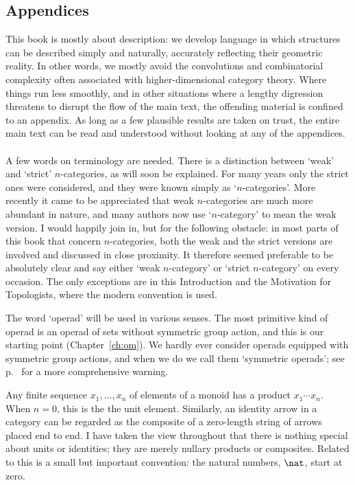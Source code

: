 \subsection*{Appendices}

This book is mostly about description: we develop language in which
structures can be described simply and naturally, accurately reflecting
their geometric reality.  In other words, we mostly avoid the convolutions
and combinatorial complexity often associated with higher-dimensional
category theory.  Where things run less smoothly, and in other situations
where a lengthy digression threatens to disrupt the flow of the main text,
the offending material is confined to an appendix.  As long as a few
plausible results are taken on trust, the entire main text can be read and
understood without looking at any of the appendices.




\paragraph*{}

A few words on terminology are needed.  There is a distinction between
`weak' and `strict' $n$-categories,%
%
%
as will soon be explained.  For many
years only the strict ones were considered, and they were known simply as
`$n$-categories'.  More recently it came to be appreciated that weak
$n$-categories are much more abundant in nature, and many authors now use
`$n$-category' to mean the weak version.  I would happily join in, but for
the following obstacle: in most parts of this book that concern
$n$-categories, both the weak and the strict versions are involved and
discussed in close proximity.  It therefore seemed preferable to be
absolutely clear and say either `weak $n$-category' or `strict
$n$-category' on every occasion.  The only exceptions are in this
Introduction and the Motivation for Topologists, where the modern
convention is used.

The word `operad'%
%
%
will be used in various senses.  The most primitive kind
of operad is an operad of sets without symmetric group action, and this is
our starting point (Chapter~\ref{ch:om}).  We hardly ever consider operads
equipped with symmetric group actions, and when we do we call them
`symmetric operads'; see p.~\pageref{p:sym-warning} for a more
comprehensive warning.

Any finite sequence $x_1, \ldots, x_n$ of elements of a monoid has a
product $x_1 \cdots x_n$.  When $n=0$, this is the the unit element.
Similarly, an identity arrow in a category can be regarded as the composite
of a zero-length string of arrows placed end to end.  I have taken the view
throughout that there is nothing special about units or identities; they
are merely nullary%
%
%
products or composites.  Related to this is a small but
important convention: the natural%
%
%
numbers, $\nat$,%
% 
%
start at zero.


